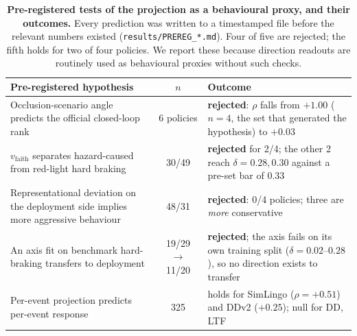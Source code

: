\begin{table}[t]
\centering
\caption{\textbf{Pre-registered tests of the projection as a behavioural proxy, and
their outcomes.} Every prediction was written to a timestamped file before the
relevant numbers existed (\texttt{results/PREREG\_*.md}). Four of five are rejected;
the fifth holds for two of four policies. We report these because direction readouts
are routinely used as behavioural proxies without such checks.}
\label{tab:negative}
\footnotesize
\setlength{\tabcolsep}{3pt}
\begin{tabular}{@{}p{}@{\,}c@{\,}p{}@{}}
\toprule
Pre-registered hypothesis & $n$ & Outcome \\
\midrule
Occlusion-scenario angle predicts the official closed-loop rank & 6 policies & \textbf{rejected}: $\rho$ falls from $+1.00$ ($n{=}4$, the set that generated the hypothesis) to $+0.03$ \\
\addlinespace
$v_{\mathrm{faith}}$ separates hazard-caused from red-light hard braking & 30/49 & \textbf{rejected} for 2/4; the other 2 reach $\delta{=}0.28,0.30$ against a pre-set bar of $0.33$ \\
\addlinespace
Representational deviation on the deployment side implies more aggressive behaviour & 48/31 & \textbf{rejected}: 0/4 policies; three are \emph{more} conservative \\
\addlinespace
An axis fit on benchmark hard-braking transfers to deployment & 19/29 $\to$ 11/20 & \textbf{rejected}; the axis fails on its own training split ($\delta{=}0.02$--$0.28$), so no direction exists to transfer \\
\addlinespace
Per-event projection predicts per-event response & 325 & holds for SimLingo ($\rho{=}{+}0.51$) and DDv2 ($+0.25$); null for DD, LTF \\
\bottomrule
\end{tabular}
\end{table}